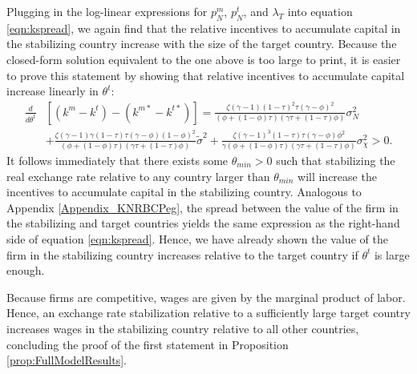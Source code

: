 Plugging in the log-linear expressions for $p^m_N$, $p^t_N$, and
$\lambda_T$ into equation \eqref{eqn:kspread}, we again find that the
relative incentives to accumulate capital in the stabilizing country
increase with the size of the target country. Because the closed-form
solution equivalent to the one above is too large to print, it is
easier to prove this statement by showing that relative incentives to
accumulate capital increase linearly in \(\theta^t\):
\begin{align*}
  \frac{d}{d \theta^t}
  & \left[ \left( k^m - k^t \right) - \left( k^{m \ast} - k^{t \ast} \right) \right]
    = \frac{\zeta (\gamma - 1) (1 - \tau)^2 \tau (\gamma - \phi)^2}{\left( \phi + (1 - \phi) \tau \right)\left( \gamma \tau + (1 - \tau) \phi \right)}\sigma_N^2 \\
  & + \frac{\zeta (\gamma - 1) \gamma (1 - \tau) \tau (\gamma - \phi) (1 - \phi)^2}{\left( \phi + (1 - \phi) \tau \right)\left( \gamma \tau + (1 - \tau) \phi \right)}\tilde{\sigma}^2 
    + \frac{\zeta (\gamma - 1)^3 (1 - \tau) \tau (\gamma - \phi) \phi^2}{\gamma \left( \phi + (1 - \phi) \tau \right)\left( \gamma \tau + (1 - \tau) \phi \right)} \sigma_{\chi}^2 > 0. 
\end{align*}
It follows immediately that there exists some $\theta_{min}>0$ such
that stabilizing the real exchange rate relative to any country larger
than $\theta_{min}$ will increase the incentives to accumulate capital
in the stabilizing country. Analogous to Appendix
\ref{Appendix_KNRBCPeg}, the spread between the value of the firm in
the stabilizing and target countries yields the same expression as the
right-hand side of equation \eqref{eqn:kspread}. Hence, we have
already shown the value of the firm in the stabilizing country
increases relative to the target country if $\theta^t$ is large
enough.

Because firms are competitive, wages are given by the marginal product
of labor. Hence, an exchange rate stabilization relative to a
sufficiently large target country increases wages in the stabilizing
country relative to all other countries, concluding the proof of the
first statement in Proposition \ref{prop:FullModelResults}.

